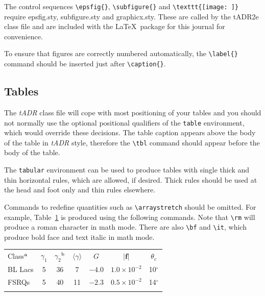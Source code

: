 \documentclass{tADR2e}
\begin{document}
The control sequences \verb"\epsfig{}", \verb"\subfigure{}" and \verb"\texttt{[image: ]}" require epsfig.sty,
subfigure.sty and graphicx.sty. These are called by the tADR2e class file and are included with the \LaTeX\
package for this journal for convenience.

To ensure that figures are correctly numbered automatically, the \verb"\label{}" command should be inserted just
after \verb"\caption{}".


\subsection{Tables}

The {\it tADR} class file will cope with most positioning of your tables and you should not normally use the optional
positional qualifiers of the {\tt table} environment, which would override these decisions. The table caption
appears above the body of the table in {\it tADR} style, therefore the \verb"\tbl" command should appear before
the body of the table.

The {\tt tabular} environment can be used to produce tables with single thick and thin horizontal rules, which
are allowed, if desired. Thick rules should be used at the head and foot only and thin rules elsewhere.

Commands to redefine quantities such as \verb"\arraystretch" should be omitted. For example, Table~\ref{symbols}
is produced using the following commands. Note that \verb"\rm" will produce a roman character in math mode. There
are also \verb"\bf" and \verb"\it", which produce bold face and text italic in math mode.

\begin{table}
{\begin{tabular}[l]{@{}lcccccc}\toprule
  Class$^{\rm a}$
  & $\gamma _1$ & $\gamma _2$$^{\rm b}$
         & $\langle \gamma \rangle$
         & $G$ & $|{\bm f}|$ & $\theta _{c}$ \\
\colrule
  BL Lacs &5 & 36 & 7 & $-4.0$ & $1.0\times 10^{-2}$ & 10$^\circ$ \\
  FSRQs & 5 & 40 & 11 & $-2.3$ & $0.5\times 10^{-2}$ & 14$^\circ$ \\
\botrule
\end{tabular}}
\label{symbols}
\end{table}
\end{document}
